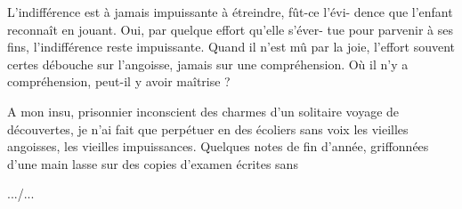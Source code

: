 L'indifférence est à jamais impuissante à étreindre, fût-ce l'évi-%
dence que l'enfant reconnaît en jouant. Oui, par quelque effort qu'elle s'éver-%
tue pour parvenir à ses fins, l'indifférence reste impuissante. Quand il n'est
mû par la joie, l'effort souvent certes débouche sur l'angoisse, jamais sur
une compréhension. Où il n'y a compréhension, peut-il y avoir maîtrise ?

A mon insu, prisonnier inconscient des charmes d'un solitaire
voyage de découvertes, je n'ai fait que perpétuer en des écoliers sans voix
les vieilles angoisses, les vieilles impuissances. Quelques notes de fin
d'année, griffonnées d'une main lasse sur des copies d'examen écrites sans

\hfill .../...

